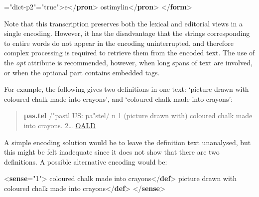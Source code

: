\begin{shaded}
{\hspace*{1em}\hspace*{1em}{xml:id}="{dict-p2}"\hspace*{1em}{opt}="{true}">}e{</\textbf{pron}>}\mbox{}\newline 
{}ostimylin{</\textbf{pron}>}\mbox{}\newline 
{</\textbf{form}>}\end{shaded}\egroup\par \par
Note that this transcription preserves both the lexical and editorial views in a single encoding. However, it has the disadvantage that the strings corresponding to entire words do not appear in the encoding uninterrupted, and therefore complex processing is required to retrieve them from the encoded text. The use of the {\itshape opt} attribute is recommended, however, when long spans of text are involved, or when the optional part contains embedded tags.\par
For example, the following gives two definitions in one text: ‘picture drawn with coloured chalk made into crayons’, and ‘coloured chalk made into crayons’: 
\begin{quote}{\bfseries pas.tel} /"pastl US: pa"stel/ n 1 (picture drawn with) coloured chalk made into crayons. 2… \hyperref[DIC-OALD]{OALD}\end{quote}
\par
A simple encoding solution would be to leave the definition text unanalysed, but this might be felt inadequate since it does not show that there are two definitions. A possible alternative encoding would be:\par\bgroup{}\exampleFont \begin{shaded}\noindent\mbox{}{<\textbf{sense}\hspace*{1em}{n}="{1}">}\mbox{}\newline 
{}coloured\mbox{}\newline 
\hspace*{1em}\hspace*{1em} chalk made into crayons{</\textbf{def}>}\mbox{}\newline 
{}picture drawn with coloured chalk\mbox{}\newline 
\hspace*{1em}\hspace*{1em} made into crayons{</\textbf{def}>}\mbox{}\newline 
{</\textbf{sense}>}\end{shaded}\egroup\par \par
